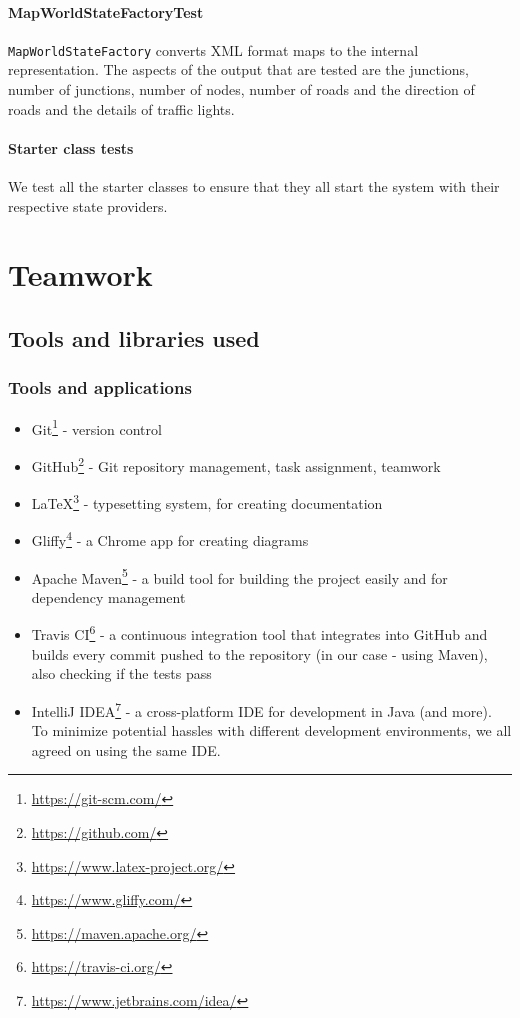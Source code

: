 \documentclass[a4paper,12pt]{article}
\begin{document}
\paragraph*{MapWorldStateFactoryTest} \verb|MapWorldStateFactory| converts XML format maps to the internal representation. The aspects of the output that are tested are the junctions, number of junctions, number of nodes, number of roads and the direction of roads and the details of traffic lights.\\
\paragraph*{Starter class tests} We test all the starter classes to ensure that they all start the system with their respective state providers.


\section{Teamwork}

\subsection{Tools and libraries used}

\subsubsection*{Tools and applications}

\begin{itemize}
	\item Git\footnote{\url{https://git-scm.com/}} - version control
	\item GitHub\footnote{\url{https://github.com/}} - Git repository management, task assignment, teamwork
	\item \LaTeX\footnote{\url{https://www.latex-project.org/}} - typesetting system, for creating documentation
	\item Gliffy\footnote{\url{https://www.gliffy.com/}} - a Chrome app for creating diagrams
	\item Apache Maven\footnote{\url{https://maven.apache.org/}} - a build tool for building the project easily and for dependency management
	\item Travis CI\footnote{\url{https://travis-ci.org/}} - a continuous integration tool that integrates into GitHub and builds every commit pushed to the repository (in our case - using Maven), also checking if the tests pass
	\item IntelliJ IDEA\footnote{\url{https://www.jetbrains.com/idea/}} - a cross-platform IDE for development in Java (and more). To minimize potential hassles with different development environments, we all agreed on using the same IDE.
\end{itemize}
\end{document}
